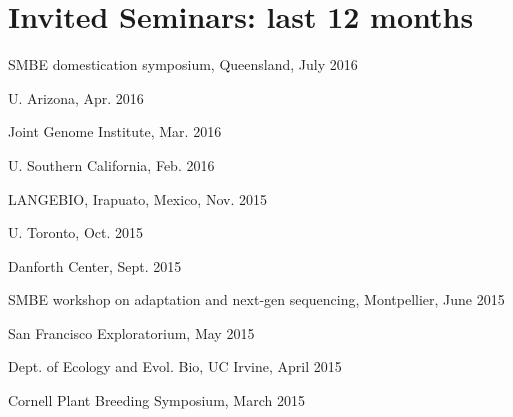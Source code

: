 \documentclass[letterpaper]{article}
\renewenvironment{itemize}{
  \begin{list}{}{
    \setlength{\leftmargin}{1.5em}
  }
}{
  \end{list}
}
\begin{document}
\section*{Invited Seminars: last 12 months}
\begin{itemize}
\item SMBE domestication symposium, Queensland, July 2016
\item U. Arizona, Apr. 2016
\item Joint Genome Institute, Mar. 2016
\item U. Southern California, Feb. 2016
\item LANGEBIO, Irapuato, Mexico, Nov. 2015
\item U. Toronto, Oct. 2015
\item Danforth Center, Sept. 2015
\item SMBE workshop on adaptation and next-gen sequencing, Montpellier, June 2015
\item San Francisco Exploratorium, May 2015 
\item Dept. of Ecology and Evol. Bio, UC Irvine, April 2015
\item Cornell Plant Breeding Symposium, March 2015

\end{itemize}
\end{document}
